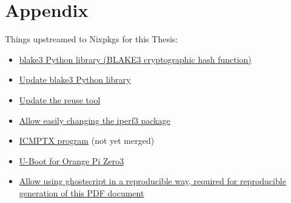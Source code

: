
\chapter{Appendix}
\label{chap:appendix}

Things upstreamed to Nixpkgs for this Thesis:
\begin{itemize}
  \item \href{https://github.com/NixOS/nixpkgs/pull/343277}{blake3 Python library (BLAKE3 cryptographic hash function)}
  \item \href{https://github.com/NixOS/nixpkgs/pull/360435}{Update blake3 Python library}
  \item \href{https://github.com/NixOS/nixpkgs/pull/281636}{Update the reuse tool}
  \item \href{https://github.com/NixOS/nixpkgs/pull/333462}{Allow easily changing the iperf3 package}
  \item \href{https://github.com/NixOS/nixpkgs/pull/357574}{ICMPTX program} (not yet merged)
  \item \href{https://github.com/NixOS/nixpkgs/pull/326845}{U-Boot for Orange Pi Zero3}
  \item \href{https://github.com/NixOS/nixpkgs/pull/362173}{Allow using ghostscript in a reproducible way, required for reproducible generation of this PDF document}
\end{itemize}

